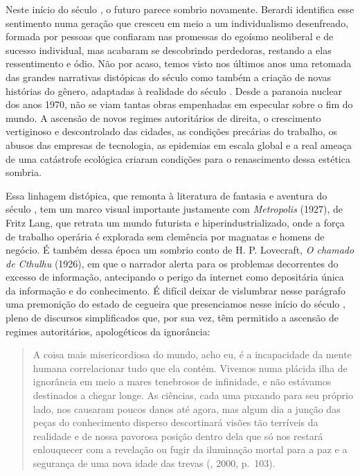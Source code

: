 Neste início do século , o futuro parece sombrio novamente. Berardi
identifica esse sentimento numa geração que cresceu em meio a um
individualismo desenfreado, formada por pessoas que confiaram nas
promessas do egoísmo neoliberal e de sucesso individual, mas acabaram se descobrindo perdedoras, restando a elas ressentimento e ódio. Não por acaso, temos visto
nos últimos anos uma retomada das grandes narrativas distópicas do
século  como também a criação de novas histórias do gênero, adaptadas à realidade do século . Desde a paranoia nuclear dos anos 1970, não se viam tantas
obras empenhadas em especular sobre o fim do mundo. A ascensão de novos
regimes autoritários de direita, o crescimento vertiginoso e
descontrolado das cidades, as condições precárias do trabalho, os abusos
das empresas de tecnologia, as epidemias em escala global e a real ameaça de uma catástrofe ecológica
criaram condições para o renascimento dessa estética sombria.

Essa linhagem distópica, que remonta à literatura de fantasia e aventura
do século , tem um marco visual importante justamente com
\emph{Metropolis} (1927), de Fritz Lang, que retrata um mundo futurista
e hiperindustrializado, onde a força de trabalho operária é explorada
sem clemência por magnatas e homens de negócio. É também dessa época um sombrio conto de H. P. Lovecraft, \emph{O chamado de Cthulhu} (1926), em que o narrador alerta para os problemas decorrentes do excesso de informação, antecipando o perigo da internet como depositária única da informação e do conhecimento. É difícil deixar de vislumbrar nesse parágrafo uma premonição do estado de cegueira que presenciamos nesse início do século , pleno de discursos simplificados que, por sua vez, têm permitido a ascensão de regimes autoritários, apologéticos da ignorância:

\begin{quote}
A coisa mais misericordiosa do mundo, acho eu, é a incapacidade da mente humana correlacionar tudo que ela contém. Vivemos numa plácida ilha de ignorância em meio a mares tenebrosos de infinidade, e não estávamos destinados a chegar longe. As ciências, cada uma puxando para seu próprio lado, nos causaram poucos danos até agora, mas algum dia a junção das peças do conhecimento disperso descortinará visões tão terríveis da realidade e de nossa pavorosa posição dentro dela que só nos restará enlouquecer com a revelação ou fugir da iluminação mortal para a paz e a segurança de uma nova idade das trevas (, 2000, p.~103).
\end{quote}


